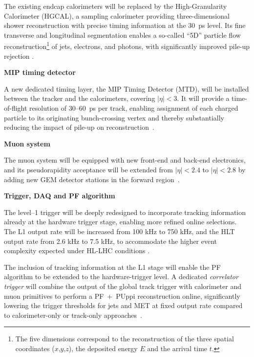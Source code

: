 The existing endcap calorimeters will be replaced by the High-Granularity Calorimeter (HGCAL), a sampling calorimeter providing three-dimensional shower reconstruction with precise timing information at the 30~ps level. Its fine transverse and longitudinal segmentation enables a so-called ``5D'' particle flow reconstruction\footnote{The five dimensions correspond to the reconstruction of the three spatial coordinates ($x$,$y$,$z$), the deposited energy $E$ and the arrival time $t$.} of jets, electrons, and photons, with significantly improved pile-up rejection \cite{Phase2HGCAL}.

\vspace{0.5 cm}
\noindent \textbf{MIP timing detector}
\vspace{0.5 cm}

A new dedicated timing layer, the MIP Timing Detector (MTD), will be installed between the tracker and the calorimeters, covering $|\eta| < 3$. It will provide a time-of-flight resolution of 30--60~ps per track, enabling assignment of each charged particle to its originating bunch-crossing vertex and thereby substantially reducing the impact of pile-up on reconstruction~\cite{Phase2MTD}.

\vspace{0.5 cm}
\noindent \textbf{Muon system}
\vspace{0.5 cm}

The muon system will be equipped with new front-end and back-end electronics, and its pseudorapidity acceptance will be extended from $|\eta| < 2.4$ to $|\eta| < 2.8$ by adding new GEM detector stations in the forward region~\cite{CERN-LHCC-2017-012}.

\vspace{0.5 cm}
\noindent \textbf{Trigger, DAQ and PF algorithm}
\vspace{0.5 cm}

The level--1 trigger will be deeply redesigned to incorporate tracking information already at the hardware trigger stage, enabling more refined online selections. The L1 output rate will be increased from 100 kHz to 750 kHz, and the HLT output rate from 2.6 kHz to 7.5 kHz, to accommodate the higher event complexity expected under HL-LHC conditions \cite{Phase2L1trigger}.

\vspace{0.5 cm}

The inclusion of tracking information at the L1 stage will enable the PF algorithm to be extended to the hardware-trigger level. A dedicated \textit{correlator trigger} will combine the output of the global track trigger with calorimeter and muon primitives to perform a PF~+~PUppi reconstruction online, significantly lowering the trigger thresholds for jets and MET at fixed output rate compared to calorimeter-only or track-only approaches~\cite{Phase2L1trigger}.